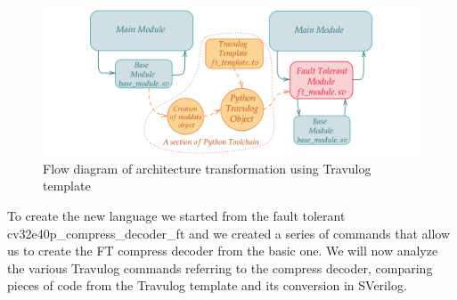 {	\begin{figure}[H]
		\centering
		\includegraphics[scale=0.2,center]{./images/Travulog_flow_blocks.png}
		\caption{Flow diagram of architecture transformation using Travulog template}
		\label{fig:TravulogFlowBlocks}
	\end{figure} 

	
	To create the new language we started from the fault tolerant cv32e40p\_compress\_decoder\_ft and we created a series of commands that allow us to create the FT compress decoder from the basic one. We will now analyze the various Travulog commands referring to the compress decoder, comparing pieces of code from the Travulog template and its conversion in SVerilog.
	
	
}
